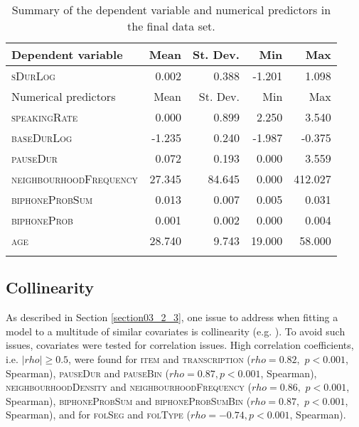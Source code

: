 \begin{table}\fontsize{10}{11}
\caption{Summary of the dependent variable and numerical predictors in the final data set.}
\label{tab:4.3}
\centering
\begin{tabular}{lrrrr} 
\lsptoprule
Dependent variable     & Mean   & St. Dev. & Min        & Max      \\ 
\midrule
\textsc{sDurLog}                & 0.002  & 0.388    & -1.201 & 1.098   \\ 
\midrule
Numerical predictors   & Mean   & St. Dev. & Min        & Max      \\ 
\midrule
\textsc{speakingRate}           & 0.000 & 0.899    & 2.250      & 3.540    \\
\textsc{baseDurLog}             & -1.235  & 0.240    & -1.987      & -0.375    \\
\textsc{pauseDur}               & 0.072  & 0.193    & 0.000      & 3.559    \\
\textsc{neighbourhoodFrequency} & 27.345 & 84.645   & 0.000      & 412.027  \\
\textsc{biphoneProbSum}         & 0.013  & 0.007    & 0.005      & 0.031    \\
\textsc{biphoneProb}            & 0.001  & 0.002    & 0.000      & 0.004    \\
\textsc{age}                    & 28.740 & 9.743    & 19.000     & 58.000   \\
\lspbottomrule
\end{tabular}
\end{table}


\subsection{Collinearity}\label{section04_2_3}

As described in Section \ref{section03_2_3}, one issue to address when fitting a model to a multitude of similar covariates is collinearity (e.g. \cite{Tomaschek2018collin}). To avoid such issues, covariates were tested for correlation issues. High correlation coefficients, i.e. $|rho|≥0.5$, were found for \textsc{item} and \textsc{transcription} ($rho=0.82,$ $p<0.001$, Spearman), \textsc{pauseDur} and \textsc{pauseBin} ($rho=0.87,p<0.001$, Spearman), \textsc{neighbourhoodDensity} and \textsc{neighbourhoodFrequency} ($rho=0.86,$ $p<0.001$, Spearman), \textsc{biphoneProbSum} and \textsc{biphoneProbSumBin} ($rho=0.87,$ $p<0.001$, Spearman), and for \textsc{folSeg} and \textsc{folType} ($rho=-0.74,p<0.001$, Spearman).    


